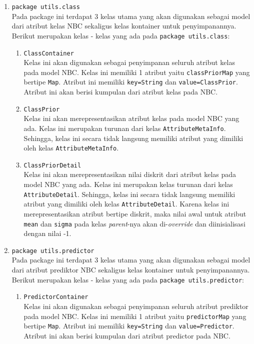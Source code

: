 \begin{enumerate}
	\item{\texttt{package utils.class}}\\
	Pada package ini terdapat 3 kelas utama yang akan digunakan sebagai model dari atribut kelas NBC sekaligus kelas kontainer untuk penyimpanannya. Berikut merupakan kelas - kelas yang ada pada \texttt{package utils.class}:
	\begin{enumerate}
		\item \texttt{ClassContainer}\\
		Kelas ini akan digunakan sebagai penyimpanan seluruh atribut kelas pada model NBC. Kelas ini memiliki 1 atribut yaitu \texttt{classPriorMap} yang bertipe \texttt{Map}. Atribut ini memiliki \texttt{key=String} dan \texttt{value=ClassPrior}. Atribut ini akan berisi kumpulan dari atribut kelas pada NBC.

		\item \texttt{ClassPrior}\\
		Kelas ini akan merepresentasikan atribut kelas pada model NBC yang ada. Kelas ini merupakan turunan dari kelas \texttt{AttributeMetaInfo}. Sehingga, kelas ini secara tidak langsung memiliki atribut yang dimiliki oleh kelas \texttt{AttributeMetaInfo}.

		\item \texttt{ClassPriorDetail}\\
		Kelas ini akan merepresentasikan nilai diskrit dari atribut kelas pada model NBC yang ada. Kelas ini merupakan kelas turunan dari kelas \texttt{AttributeDetail}. Sehingga, kelas ini secara tidak langsung memiliki atribut yang dimiliki oleh kelas \texttt{AttributeDetail}. Karena kelas ini merepresentasikan atribut bertipe diskrit, maka nilai awal untuk atribut \texttt{mean} dan \texttt{sigma} pada kelas \textit{parent}-nya akan di-\textit{override} dan diinisialisasi dengan nilai -1.
		
	\end{enumerate}
	
	\item{\texttt{package utils.predictor}}\\
	Pada package ini terdapat 3 kelas utama yang akan digunakan sebagai model dari atribut prediktor NBC sekaligus kelas kontainer untuk penyimpanannya. Berikut merupakan kelas - kelas yang ada pada \texttt{package utils.predictor}:
	\begin{enumerate}
		\item \texttt{PredictorContainer}\\
		Kelas ini akan digunakan sebagai penyimpanan seluruh atribut prediktor pada model NBC. Kelas ini memiliki 1 atribut yaitu \texttt{predictorMap} yang bertipe \texttt{Map}. Atribut ini memiliki \texttt{key=String} dan \texttt{value=Predictor}. Atribut ini akan berisi kumpulan dari atribut predictor pada NBC.


\end{enumerate}
\end{enumerate}
